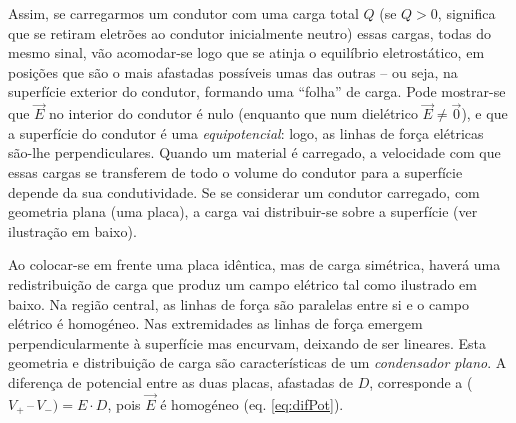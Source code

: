 \documentclass[12pt,a4paper,oneside]{paper}
\begin{document}
Assim, se carregarmos um condutor com uma carga total $Q$ (se $Q > 0$, significa que se retiram eletrões ao condutor
inicialmente neutro) essas cargas, todas do mesmo sinal, vão
acomodar-se logo que se atinja o equilíbrio eletrostático, em posições que são o mais afastadas possíveis umas das
outras -- ou seja, na superfície exterior do condutor, formando uma ``folha'' de carga. Pode mostrar-se que $\vec{E}$ no
interior do condutor é nulo (enquanto que num
dielétrico $\vec{E} \ne \vec{0}$), e que a superfície do condutor é uma \emph{equipotencial}: logo, as linhas de força
elétricas são-lhe perpendiculares. Quando um material é carregado, a velocidade com que essas cargas se transferem de
todo o volume do condutor para a superfície depende da sua condutividade. Se se considerar um condutor carregado, com
geometria plana (uma placa), a carga vai distribuir-se sobre a superfície (ver ilustração em baixo).
\setlength{\unitlength}{0.8cm} 
\begin{center}
\end{center}
Ao colocar-se em frente uma placa idêntica, mas de carga simétrica, haverá uma redistribuição de carga que produz um campo
elétrico tal como ilustrado em baixo. Na região central, as linhas de força são paralelas entre si e o campo elétrico é
homogéneo. Nas extremidades as linhas de força emergem perpendicularmente à superfície mas encurvam, deixando de ser lineares.
Esta geometria e distribuição de carga são características de um \emph{condensador plano}. A diferença de potencial entre
as duas placas, afastadas de $D$, corresponde a ($V_+ \,–\, V_-) = E\cdot D$, pois $\vec{E}$ é homogéneo (eq. \ref{eq:difPot}).\\
\setlength{\unitlength}{1.0cm} 
\begin{center}
\end{center}
\end{document}
